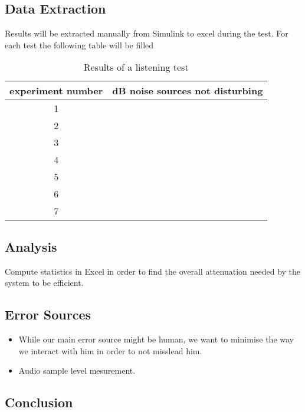 
\subsection{Data Extraction}
Results will be extracted manually from Simulink to excel during the test.
For each test the following table will be filled \\
\begin{table}[h]
\centering
	\begin{tabular}{c  c} \toprule
		experiment number & dB noise sources not disturbing  \\ \bottomrule
		1	&   \\
		2	&	\\
		3	&	\\
		4	&	\\
		5	&	\\
		6	&	\\
		7	&	\\ \bottomrule
	\end{tabular}
	\caption{Results of a listening test}
	\label{tab:ListeningRes}
\end{table}

\subsection{Analysis}
Compute statistics in Excel in order to find the overall attenuation needed by the system to be efficient.

\subsection{Error Sources}
\begin{itemize}
\item While our main error source might be human, we want to minimise the way we interact with him in order to not misslead him.
\item Audio sample level mesurement.
\end{itemize}

\vspace{1cm}
\subsection{Conclusion}


